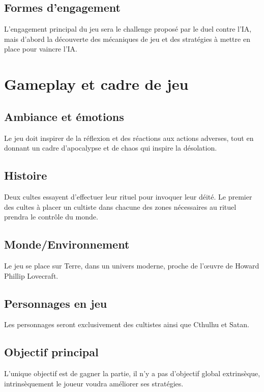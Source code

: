 \documentclass[a4paper]{scrreprt}
\begin{document}
\section{Formes d'engagement}

L'engagement principal du jeu sera le challenge proposé par le duel contre l'IA, mais d'abord la découverte des mécaniques de jeu et des stratégies à mettre en place pour vaincre l'IA.



\chapter{Gameplay et cadre de jeu}

\section{Ambiance et émotions}

Le jeu doit inspirer de la réflexion et des réactions aux actions adverses, tout en donnant un cadre d'apocalypse et de chaos qui inspire la désolation.

\section{Histoire}

Deux cultes essayent d'effectuer leur rituel pour invoquer leur déité. Le premier des cultes à placer un cultiste dans chacune des zones nécessaires au rituel prendra le contrôle du monde.

\section{Monde/Environnement}

Le jeu se place sur Terre, dans un univers moderne, proche de l'\oe uvre de Howard Phillip Lovecraft.

\section{Personnages en jeu}
Les personnages seront exclusivement des cultistes ainsi que Cthulhu et Satan.

\section{Objectif principal}

L'unique objectif est de gagner la partie, il n'y a pas d'objectif global extrinsèque, intrinsèquement le joueur voudra améliorer ses stratégies.
\end{document}
